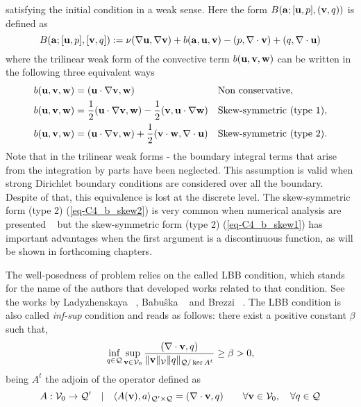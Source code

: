satisfying the initial condition  in a weak sense. Here the form $B({{\bf a}};[{\bf u},p],({\bf v},q))$ is defined as 
\begin{equation}
\label{eq-C2_bilinear}
B({\bf a};[{\bf u},p],[{\bf v},q]):=\nu(\nabla{\bf u},\nabla{\bf v})+b({\bf a},{\bf u},{\bf v})-(p,\nabla\cdot{\bf v})+(q,\nabla\cdot{\bf u})
\end{equation}
where the trilinear weak form of the convective term $b({\bf u},{\bf v},{\bf w})$ can be written in the following three equivalent ways
\begin{align}
\label{eq-C2_b_noskew}
&b({\bf u},{\bf v},{\bf w})=({\bf u}\cdot\nabla{\bf v},{\bf w})&&\mbox{Non conservative},\\
\label{eq-C2_b_skew1}
&b({\bf u},{\bf v},\mathbf{w})=\frac{1}{2}({\bf u}\cdot\nabla{\bf v},\mathbf{w})-\frac{1}{2}({\bf v},{\bf u}\cdot\nabla\mathbf{w})&&\mbox{Skew-symmetric (type 1)},\\
\label{eq-C2_b_skew2}
&b({\bf u},{\bf v},\mathbf{w})=({\bf u}\cdot\nabla{\bf v},\mathbf{w})+\frac{1}{2}({\bf v}\cdot\mathbf{w},\nabla\cdot{\bf u})&&\mbox{Skew-symmetric (type 2)}.
\end{align}
Note that in the trilinear weak forms - the boundary integral terms that arise from the integration by parts have been neglected. This assumption is valid when strong Dirichlet boundary conditions are considered over all the boundary. Despite of that, this equivalence is lost at the discrete level. The skew-symmetric form (type 2) (\ref{eq-C4_b_skew2}) is very common when numerical analysis are presented ~\cite{badia_convergence_2014,burman_galerkin_2009,guermond_faedogalerkin_2007} but the skew-symmetric form (type 2) (\ref{eq-C4_b_skew1}) has important advantages when the first argument is a discontinuous function, as will be shown in forthcoming chapters.

The well-posedness of problem  relies on the called LBB condition, which stands for the name of the authors that developed works related to that condition. See the works by Ladyzhenskaya ~\cite{ladyzhenskaya1969mathematical}, Babu\^{s}ka ~\cite{babuska_error-bounds_1971} and Brezzi ~\cite{brezzi1974existence}. The LBB condition is also called \textit{inf-sup} condition and reads as follows: there exist a positive constant $ \beta $ such that,
\begin{equation}
\label{eq-C2_lbb}
\inf_{q\in\mathcal{Q}}\sup_{{\bf v}\in\mathcal{V}_0}\frac{(\nabla\cdot{\bf v},q)}{\|{\bf v}\|_\mathcal{V}\|q\|_{\mathcal{Q}/\ker A^t}}\ge\beta>0,
\end{equation}
being $ A^t $ the adjoin of the operator defined as 
\begin{equation}
\label{eq-C2_lbb_operator}
A: \mathcal{V}_0\rightarrow\mathcal{Q'} \quad| \quad\langle A({\bf v}),a\rangle_{\mathcal{Q'}\times\mathcal{Q}}=(\nabla\cdot{\bf v},q)\quad\quad\forall{\bf v}\in\mathcal{V}_0,\quad\forall q\in\mathcal{Q}
\end{equation}

